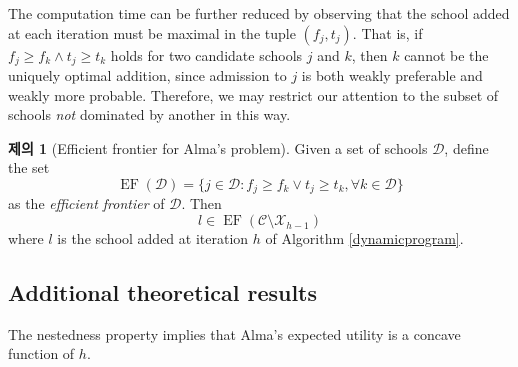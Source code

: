 \documentclass[12pt]{article} %
\theoremstyle{definition}
\newtheorem{proposition}{Proposition}
\theoremstyle{definition}
\newtheorem{proposition}{제의}
\begin{document}
The computation time can be further reduced by observing that the school added at each iteration must be maximal in the tuple $(f_j, t_j)$. That is, if $f_j \geq f_k \wedge t_j \geq t_k$ holds for two candidate schools $j$ and $k$, then $k$ cannot be the uniquely optimal addition, since admission to $j$ is both weakly preferable and weakly more probable. Therefore, we may restrict our attention to the subset of schools \emph{not} dominated by another in this way.
\begin{proposition}[Efficient frontier for Alma's problem]
Given a set of schools $\mathcal{D}$, define the set
\begin{equation}
\operatorname{EF}(\mathcal{D})  = \{j \in \mathcal{D}: f_j \geq f_k \vee t_j \geq t_k, \forall k \in \mathcal{D}\}
\end{equation}
as the \emph{efficient frontier} of $\mathcal{D}$. Then
\begin{equation} l \in \operatorname{EF}(\mathcal{C}\setminus  \mathcal{X}_{h-1}) \end{equation}
where $l$ is the school added at iteration $h$ of Algorithm \ref{dynamicprogram}.
\end{proposition}

\subsection{Additional theoretical results}
The nestedness property implies that Alma's expected utility is a concave function of $h$.
\end{document}
